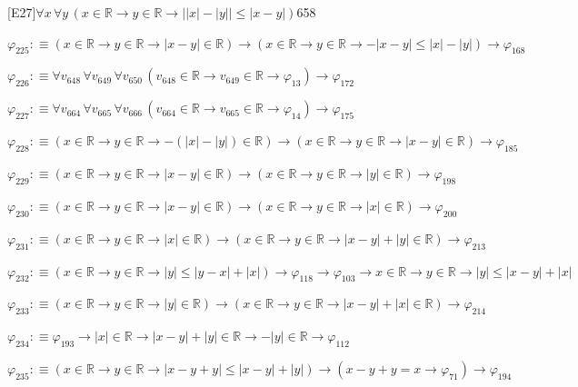 \begin{fullproof}{[E27]}{$\forall x\,\forall y\,(x \in \mathbb{R} \to y \in \mathbb{R} \to \lvert \lvert x \rvert - \lvert y \rvert \rvert \leq \lvert x - y \rvert)$}{658}
\begin{abbrevlist}
\item $\varphi_{225} :\equiv (x \in \mathbb{R} \to y \in \mathbb{R} \to \lvert x - y \rvert \in \mathbb{R}) \to (x \in \mathbb{R} \to y \in \mathbb{R} \to -\lvert x - y \rvert \leq \lvert x \rvert - \lvert y \rvert) \to \varphi_{168}$
\item $\varphi_{226} :\equiv \forall v_{648}\,\forall v_{649}\,\forall v_{650}\,(v_{648} \in \mathbb{R} \to v_{649} \in \mathbb{R} \to \varphi_{13}) \to \varphi_{172}$
\item $\varphi_{227} :\equiv \forall v_{664}\,\forall v_{665}\,\forall v_{666}\,(v_{664} \in \mathbb{R} \to v_{665} \in \mathbb{R} \to \varphi_{14}) \to \varphi_{175}$
\item $\varphi_{228} :\equiv (x \in \mathbb{R} \to y \in \mathbb{R} \to -(\lvert x \rvert - \lvert y \rvert) \in \mathbb{R}) \to (x \in \mathbb{R} \to y \in \mathbb{R} \to \lvert x - y \rvert \in \mathbb{R}) \to \varphi_{185}$
\item $\varphi_{229} :\equiv (x \in \mathbb{R} \to y \in \mathbb{R} \to \lvert x - y \rvert \in \mathbb{R}) \to (x \in \mathbb{R} \to y \in \mathbb{R} \to \lvert y \rvert \in \mathbb{R}) \to \varphi_{198}$
\item $\varphi_{230} :\equiv (x \in \mathbb{R} \to y \in \mathbb{R} \to \lvert x - y \rvert \in \mathbb{R}) \to (x \in \mathbb{R} \to y \in \mathbb{R} \to \lvert x \rvert \in \mathbb{R}) \to \varphi_{200}$
\item $\varphi_{231} :\equiv (x \in \mathbb{R} \to y \in \mathbb{R} \to \lvert x \rvert \in \mathbb{R}) \to (x \in \mathbb{R} \to y \in \mathbb{R} \to \lvert x - y \rvert + \lvert y \rvert \in \mathbb{R}) \to \varphi_{213}$
\item $\varphi_{232} :\equiv (x \in \mathbb{R} \to y \in \mathbb{R} \to \lvert y \rvert \leq \lvert y - x \rvert + \lvert x \rvert) \to \varphi_{118} \to \varphi_{103} \to x \in \mathbb{R} \to y \in \mathbb{R} \to \lvert y \rvert \leq \lvert x - y \rvert + \lvert x \rvert$
\item $\varphi_{233} :\equiv (x \in \mathbb{R} \to y \in \mathbb{R} \to \lvert y \rvert \in \mathbb{R}) \to (x \in \mathbb{R} \to y \in \mathbb{R} \to \lvert x - y \rvert + \lvert x \rvert \in \mathbb{R}) \to \varphi_{214}$
\item $\varphi_{234} :\equiv \varphi_{193} \to \lvert x \rvert \in \mathbb{R} \to \lvert x - y \rvert + \lvert y \rvert \in \mathbb{R} \to -\lvert y \rvert \in \mathbb{R} \to \varphi_{112}$
\item $\varphi_{235} :\equiv (x \in \mathbb{R} \to y \in \mathbb{R} \to \lvert x - y + y \rvert \leq \lvert x - y \rvert + \lvert y \rvert) \to (x - y + y = x \to \varphi_{71}) \to \varphi_{194}$

\end{abbrevlist}
\end{fullproof}
